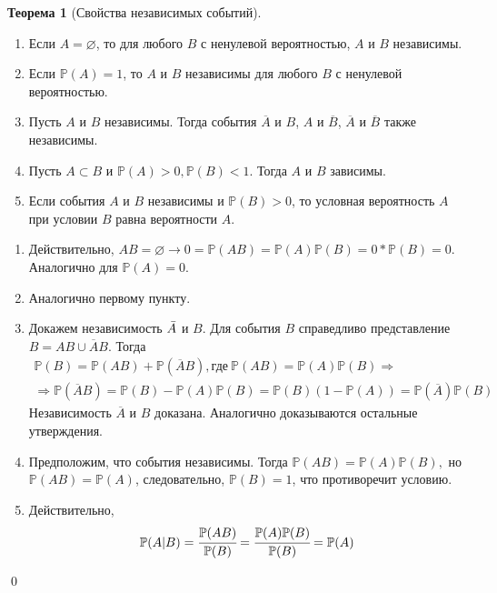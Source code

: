 \documentclass[oneside,final,14pt]{extreport}
\newcommand\myprob[1]{{\mathbb{P}(#1)}}
\renewenvironment{proof}{{\bfseries Доказательство.}}{\qed}
\theoremstyle{plain}
\theoremstyle{definition}
\theoremstyle{named}
\newtheorem*{namedthm}{Теорема}
\begin{document}
\begin{namedthm}[Свойства независимых событий]\leavevmode
    \begin{enumerate}
        \item Если $A = \varnothing$, то для любого $B$ с ненулевой вероятностью, $A$ и $B$ независимы.
        \item Если $\myprob{A} = 1$, то $A$ и $B$ независимы для любого $B$ с ненулевой вероятностью. 
        \item Пусть $A$ и $B$ независимы. Тогда события $\overline{A}$ и $B$, $A$ и $\overline{B}$, $\overline{A}$ и $\overline{B}$ также независимы. 
        \item Пусть $A \subset B$ и $\myprob{A} > 0, \myprob{B} < 1$. Тогда $A$ и $B$ зависимы. 
        \item Если события $A$ и $B$ независимы и $\myprob{B} > 0$, то условная вероятность $A$ при условии $B$ равна вероятности $A$.
    \end{enumerate}
\end{namedthm}

\begin{proof}
\begin{enumerate} 
    \item Действительно, $AB = \varnothing \rightarrow 0 = \myprob{AB} = \myprob{A}\myprob{B} = 0 * \myprob{B} = 0$. Аналогично для $\myprob{A} = 0$.
    \item Аналогично первому пункту.
    \item Докажем независимость $\Bar{A}$ и $B$. Для события $B$ справедливо представление $B = AB \cup \overline{A}B$. Тогда
    \begin{multline*}
        \myprob{B} = \myprob{AB} + \myprob{\overline{A}B}, \text{где}~ \myprob{AB} = \myprob{A}\myprob{B} \Rightarrow \\
        \Rightarrow \myprob{\overline{A}B} = \myprob{B} - \myprob{A}\myprob{B} = \myprob{B} (1 - \myprob{A}) = \myprob{\overline{A}}\myprob{B}
    \end{multline*}
    Независимость $\overline{A}$ и $B$ доказана. Аналогично доказываются остальные утверждения.
    \item Предположим, что события независимы. Тогда $\myprob{AB} = \myprob{A}\myprob{B},$ но $\myprob{AB} = \myprob{A}$, следовательно, $\myprob{B} = 1$, что противоречит условию.
    \item Действительно, 
    \begin{equation*}
        \myprob{A | B} = \cfrac{\myprob{AB}}{\myprob{B}} = \cfrac{\myprob{A}\myprob{B}}{\myprob{B}} = \myprob{A}
    \end{equation*}
\end{enumerate}
\end{proof}
\end{document}
